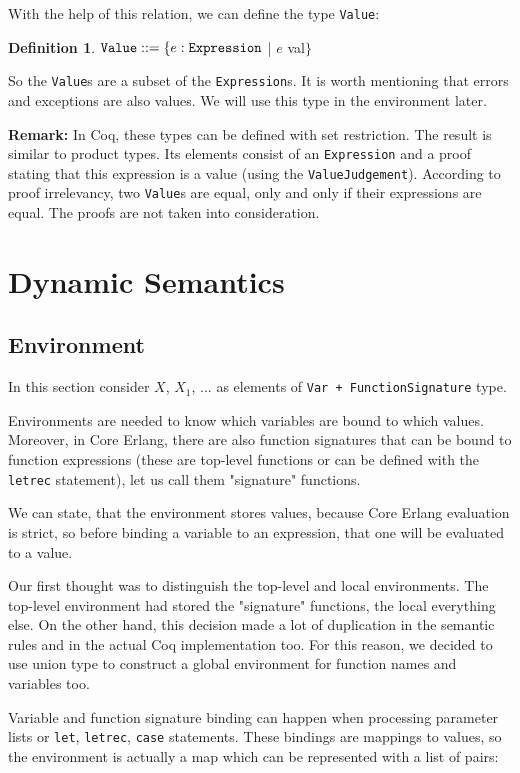\documentclass[12pt]{article}
\theoremstyle{definition}
\newtheorem{definition}{Definition}[section]
\numberwithin{equation}{section}
\begin{document}
With the help of this relation, we can define the type \verb|Value|: 

\begin{definition}
$\verb|Value| ::= \{e : \verb|Expression|$ | $e$ val$\}$
\end{definition}

\noindent So the \verb|Value|s are a subset of the \verb|Expression|s. It is worth mentioning that errors and exceptions are also values. We will use this type in the environment later.

{\bf Remark:} In Coq, these types can be defined with set restriction. The result is similar to product types. Its elements consist of an \verb|Expression| and a proof stating that this expression is a value (using the \verb|ValueJudgement|). According to proof irrelevancy, two \verb|Value|s are equal, only and only if their expressions are equal. The proofs are not taken into consideration.

\section{Dynamic Semantics}

\subsection{Environment}

In this section consider $X$, $X_1$, ... as elements of \verb|Var + FunctionSignature| type.

Environments are needed to know which variables are bound to which values. Moreover, in Core Erlang, there are also function signatures that can be bound to function expressions (these are top-level functions or can be defined with the \verb|letrec| statement), let us call them "signature" functions.

We can state, that the environment stores values, because Core Erlang evaluation is strict, so before binding a variable to an expression, that one will be evaluated to a value.

Our first thought was to distinguish the top-level and local environments. The top-level environment had stored the "signature" functions, the local everything else. On the other hand, this decision made a lot of duplication in the semantic rules and in the actual Coq implementation too. For this reason, we decided to use union type to construct a global environment for function names and variables too.

Variable and function signature binding can happen when processing parameter lists or \verb|let|, \verb|letrec|, \verb|case| statements. These bindings are mappings to values, so the environment is actually a map which can be represented with a list of pairs:
\end{document}
